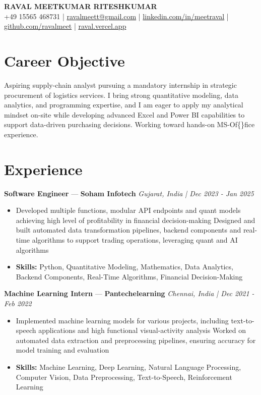 \documentclass[a4paper,10pt]{article}
\begin{document}
\begin{center}
  {\Large\bfseries RAVAL MEETKUMAR RITESHKUMAR}\\[2pt]
  {\small +49 15565 468731 \;|\; \href{mailto:ravalmeett@gmail.com}{ravalmeett@gmail.com} \;|\; \href{https://www.linkedin.com/in/meetraval/}{linkedin.com/in/meetraval} \;|\; \href{https://github.com/ravalmeet}{github.com/ravalmeet} \;|\; \href{https://raval.vercel.app/}{raval.vercel.app}}
\end{center}
\vspace{-3pt}

\section*{Career Objective}
Aspiring supply-chain analyst pursuing a mandatory internship in strategic procurement of logistics services. I bring strong quantitative modeling, data analytics, and programming expertise, and I am eager to apply my analytical mindset on-site while developing advanced Excel and Power BI capabilities to support data-driven purchasing decisions. Working toward hands-on MS-Of\{\}fice experience.\par

\section*{Experience}
\textbf{Software Engineer} — \textbf{Soham Infotech} \hfill \textit{Gujarat, India \;|\; Dec 2023 - Jan 2025}\par
\vspace{1pt}
\begin{itemize}
  \item Developed multiple functions, modular API endpoints and quant models achieving high level of profitability in financial decision-making Designed and built automated data transformation pipelines, backend components and real-time algorithms to support trading operations, leveraging quant and AI algorithms
  \item \textbf{Skills:} Python, Quantitative Modeling, Mathematics, Data Analytics, Backend Components, Real-Time Algorithms, Financial Decision-Making
\end{itemize}
\vspace{3pt}
\textbf{Machine Learning Intern} — \textbf{Pantechelearning} \hfill \textit{Chennai, India \;|\; Dec 2021 - Feb 2022}\par
\vspace{1pt}
\begin{itemize}
  \item Implemented machine learning models for various projects, including text-to-speech applications and high functional visual-activity analysis Worked on automated data extraction and preprocessing pipelines, ensuring accuracy for model training and evaluation
  \item \textbf{Skills:} Machine Learning, Deep Learning, Natural Language Processing, Computer Vision, Data Preprocessing, Text-to-Speech, Reinforcement Learning
\end{itemize}
\end{document}

